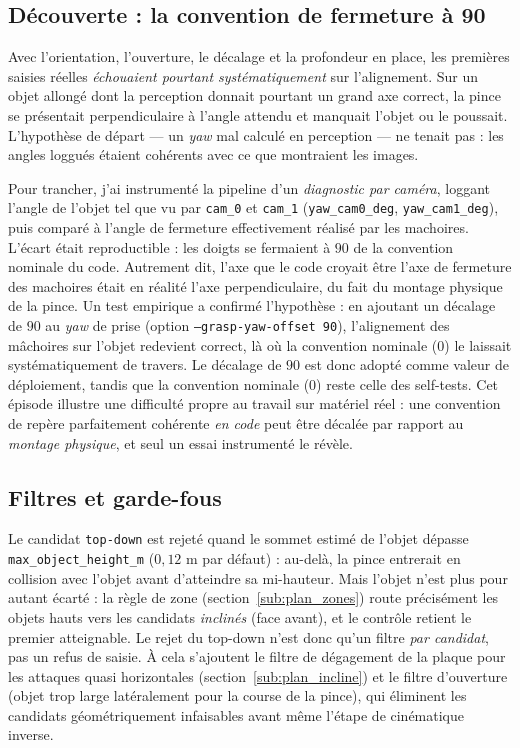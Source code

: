 \subsection{Découverte : la convention de fermeture à 90\textdegree}
\label{sub:plan_90deg}

Avec l'orientation, l'ouverture, le décalage et la profondeur en place, les
premières saisies réelles \emph{échouaient pourtant systématiquement} sur
l'alignement. Sur un objet allongé dont la perception donnait pourtant un grand
axe correct, la pince se présentait perpendiculaire à l'angle attendu et
manquait l'objet ou le poussait. L'hypothèse de départ — un \textit{yaw} mal
calculé en perception — ne tenait pas : les angles loggués étaient cohérents avec
ce que montraient les images.

Pour trancher, j'ai instrumenté la pipeline d'un \emph{diagnostic par caméra},
loggant l'angle de l'objet tel que vu par \texttt{cam\_0} et \texttt{cam\_1}
(\texttt{yaw\_cam0\_deg}, \texttt{yaw\_cam1\_deg}), puis comparé à l'angle de
fermeture effectivement réalisé par les machoires. L'écart était reproductible :
les doigts se fermaient à \(90\)\textdegree{} de la convention nominale du code.
Autrement dit, l'axe que le code croyait être l'axe de fermeture des machoires
était en réalité l'axe perpendiculaire, du fait du montage physique de la pince.
Un test empirique a confirmé l'hypothèse : en ajoutant un décalage de
\(90\)\textdegree{} au \textit{yaw} de prise (option \texttt{--grasp-yaw-offset 90}),
l'alignement des mâchoires sur l'objet redevient correct, là où la convention
nominale (\(0\)) le laissait systématiquement de travers. Le décalage de
\(90\)\textdegree{} est donc adopté comme valeur de déploiement, tandis que la
convention nominale (\(0\)) reste celle des self-tests.
Cet épisode illustre une difficulté propre au travail sur matériel réel : une
convention de repère parfaitement cohérente \emph{en code} peut être décalée par
rapport au \emph{montage physique}, et seul un essai instrumenté le révèle.

\subsection{Filtres et garde-fous}

Le candidat \texttt{top-down} est rejeté quand le sommet estimé de l'objet dépasse
\texttt{max\_object\_height\_m} (\(0{,}12\) m par défaut) : au-delà, la pince
entrerait en collision avec l'objet avant d'atteindre sa mi-hauteur. Mais
l'objet n'est plus pour autant écarté : la règle de zone (section~\ref{sub:plan_zones})
route précisément les objets hauts vers les candidats \emph{inclinés}
(face avant), et le contrôle retient le premier atteignable. Le rejet du top-down
n'est donc qu'un filtre \emph{par candidat}, pas un refus de saisie. À cela s'ajoutent
le filtre de dégagement de la plaque pour les attaques quasi horizontales
(section~\ref{sub:plan_incline}) et le filtre d'ouverture (objet trop large
latéralement pour la course de la pince), qui éliminent les candidats
géométriquement infaisables avant même l'étape de cinématique inverse.


